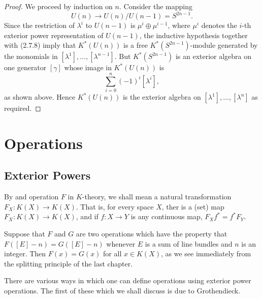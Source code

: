 \documentclass[leqno]{book}
\numberwithin{equation}{section}
\theoremstyle{definition}
\begin{document}
            \begin{proof}
              We proceed by induction on $n$. Consider the mapping
              \begin{equation*}
                U(n)\to U(n)/U(n-1)=S^{2n-1}.
              \end{equation*}
              Since the restriction of $\lambda^{i}$ to $U(n-1)$ is $\mu^{i}\oplus \mu^{i-1}$, where $\mu^{i}$ denotes the $i$-th exterior power representation of $U(n-1)$, the inductive hypothesis together with (2.7.8) imply that $K^{*}(U(n))$ is a free $K^{*}(S^{2n-1})$-module generated by the monomials in $[\lambda^{1}], \ldots ,[\lambda^{n-1}]$. But $K^{*}(S^{2n-1})$ is an exterior algebra on one generator $[\gamma]$ whose image in $K^{*}(U(n))$ is
              \begin{equation*}
                \sum_{i=0}^{n} (-1)^{i}[\lambda^{i}],
              \end{equation*}
              as shown above. Hence $K^{*}(U(n))$ is the exterior algebra on $[\lambda^{1}], \ldots ,[\lambda^{n}]$ as required.
            \end{proof}

    \chapter{Operations}
        
        \section{Exterior Powers}
            
            By and operation $F$ in $K$-theory, we shall mean a natural transformation $F_{X}:K(X)\to K(X)$. That is, for every space $X$, ther is a (set) map $F_{X}:K(X)\to K(X)$, and if $f:X\to Y$ is any continuous map, $F_{X}f^{*}=f^{*}F_{Y}$.

            Suppose that $F$ and $G$ are two operations which have the property that $F([E]-n)=G([E]-n)$ whenever $E$ is a sum of line bundles and $n$ is an integer. Then $F(x)=G(x)$ for all $x\in K(X)$, as we see immediately from the splitting principle of the last chapter.

            There are various ways in which one can define operations using exterior power operations. The first of these which we shall discuss is due to Grothendieck.
\end{document}
